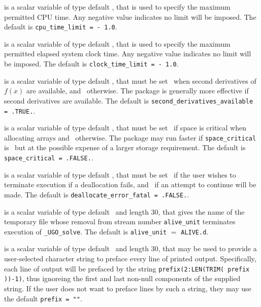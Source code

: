 \documentclass{galahad}
\newcommand{\packagename}{UGO}
\newcommand{\fullpackagename}{\libraryname\_\packagename}
\newcommand{\solver}{{\tt \fullpackagename\_solve}}
\begin{document}
\begin{description}
 is a scalar variable of type default \realdp,
that is used to specify the maximum permitted CPU time. Any negative
value indicates no limit will be imposed. The default is
{\tt cpu\_time\_limit = - 1.0}.

 is a scalar variable of type default \realdp,
that is used to specify the maximum permitted elapsed system clock time.
Any negative value indicates no limit will be imposed. The default is
{\tt clock\_time\_limit = - 1.0}.

 is a scalar variable of type default 
\logical, that must be set \true\ when second derivatives of $f(x)$ 
are available, and  \false\ otherwise. The package is generally more effective 
if second derivatives are available.
The default is {\tt second\_derivatives\_available = .TRUE.}.

 is a scalar variable of type default \logical,
that must be set \true\ if space is critical when allocating arrays
and  \false\ otherwise. The package may run faster if
{\tt space\_critical} is \false\ but at the possible expense of a larger
storage requirement. The default is {\tt space\_critical = .FALSE.}.

 is a scalar variable of type default \logical,
that must be set \true\ if the user wishes to terminate execution if
a deallocation  fails, and \false\ if an attempt to continue
will be made. The default is {\tt deallocate\_error\_fatal = .FALSE.}.

 is a scalar variable of type default \character\ and length
30, that gives the name of the temporary file whose removal from stream number
{\tt alive\_unit} terminates execution of \solver.
The default is {\tt alive\_unit} $=$ {\tt ALIVE.d}.

 is a scalar variable of type default \character\
and length 30, that may be used to provide a user-selected
character string to preface every line of printed output.
Specifically, each line of output will be prefaced by the string
{\tt prefix(2:LEN(TRIM( prefix ))-1)},
thus ignoreing the first and last non-null components of the
supplied string. If the user does not want to preface lines by such
a string, they may use the default {\tt prefix = ""}.

\end{description}

\end{document}
